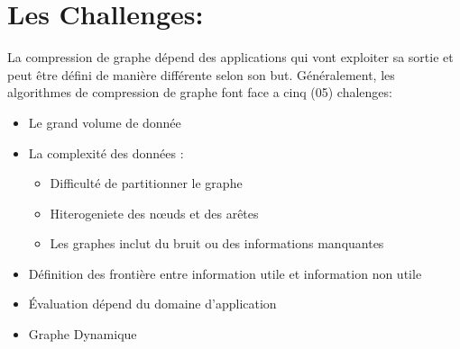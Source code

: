 \documentclass[11pt,a4paper]{report}
\begin{document}
\section{Les Challenges:}

La compression de graphe dépend des applications qui vont exploiter sa sortie et peut  être défini de manière différente selon son but. Généralement, les algorithmes de  compression de graphe font face a cinq (05) chalenges:
\begin{itemize}
\item Le grand volume de donnée
\item La complexité des données : 
	\begin{itemize}
	\item Difficulté de partitionner le graphe
	\item Hiterogeniete des nœuds et des arêtes
	\item Les graphes inclut du bruit ou des informations manquantes
	\end{itemize}
\item Définition des frontière entre information utile et information non utile
\item Évaluation dépend du domaine d'application
\item Graphe Dynamique
\end{itemize}
\end{document}
